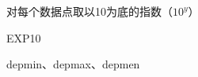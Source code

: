 \label{cmd:exp10}

对每个数据点取以10为底的指数（$10^y$）

\begin{SACSTX}
EXP10
\end{SACSTX}

depmin、depmax、depmen
